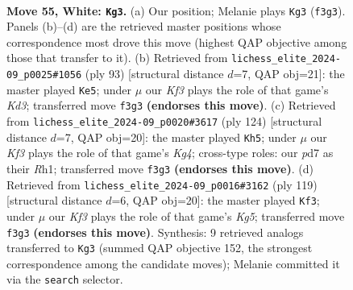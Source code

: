 \documentclass[11pt]{article}
\begin{document}
\clearpage

\begin{figure}[p]\centering
\begin{subfigure}{0.46\textwidth}\centering
\resizebox{\linewidth}{!}{%
\newchessgame
\chessboard[
  setfen={8/p2p4/2p2k2/5P2/2r5/5K2/8/8 w - - 11 55},
  showmover=false,
  pgfstyle=straightmove, color=movearrow, markmove={f3-g3}
]}
\caption{}
\end{subfigure}\hfill
\begin{subfigure}{0.46\textwidth}\centering
\resizebox{\linewidth}{!}{%
\newchessgame
\chessboard[
  setfen={6r1/R7/3k4/8/4P3/P7/1P4p1/6K1 b - - 1 47},
  showmover=false,
  pgfstyle=straightmove, color=movearrow, markmove={d6-e5}
]}
\caption{}
\end{subfigure}
\\[4pt]
\begin{subfigure}{0.46\textwidth}\centering
\resizebox{\linewidth}{!}{%
\newchessgame
\chessboard[
  setfen={r7/7k/p6P/1p6/6K1/8/8/7R w - - 4 63},
  showmover=false,
  pgfstyle=straightmove, color=movearrow, markmove={g4-h5}
]}
\caption{}
\end{subfigure}\hfill
\begin{subfigure}{0.46\textwidth}\centering
\resizebox{\linewidth}{!}{%
\newchessgame
\chessboard[
  setfen={8/5PPR/8/p7/2pK2k1/8/8/8 b - - 0 60},
  showmover=false,
  pgfstyle=straightmove, color=movearrow, markmove={g4-f3}
]}
\caption{}
\end{subfigure}
\caption{\textbf{Move 55, White: \texttt{Kg3}.} (a) Our position; Melanie plays \texttt{Kg3} (\texttt{f3g3}). Panels (b)--(d) are the retrieved master positions whose correspondence most drove this move (highest QAP objective among those that transfer to it). (b) Retrieved from \texttt{lichess\_elite\_2024-09\_p0025\#1056} (ply 93) [structural distance $d$=7, QAP obj=21]: the master played \texttt{Ke5}; under $\mu$ our \emph{Kf3} plays the role of that game's \emph{Kd3}; transferred move \texttt{f3g3} \textbf{(endorses this move)}. (c) Retrieved from \texttt{lichess\_elite\_2024-09\_p0020\#3617} (ply 124) [structural distance $d$=7, QAP obj=20]: the master played \texttt{Kh5}; under $\mu$ our \emph{Kf3} plays the role of that game's \emph{Kg4}; cross-type roles: our \emph{p}d7 as their \emph{R}h1; transferred move \texttt{f3g3} \textbf{(endorses this move)}. (d) Retrieved from \texttt{lichess\_elite\_2024-09\_p0016\#3162} (ply 119) [structural distance $d$=6, QAP obj=20]: the master played \texttt{Kf3}; under $\mu$ our \emph{Kf3} plays the role of that game's \emph{Kg5}; transferred move \texttt{f3g3} \textbf{(endorses this move)}. Synthesis: 9 retrieved analogs transferred to \texttt{Kg3} (summed QAP objective 152, the strongest correspondence among the candidate moves); Melanie committed it via the \texttt{search} selector.}
\label{fig:thought-m108}
\end{figure}
\end{document}
